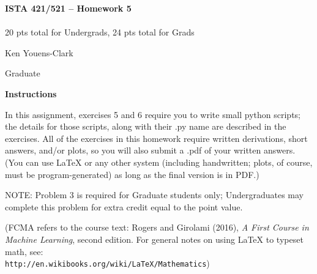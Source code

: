 \documentclass[10pt]{article}
\newcommand{\latex}{\LaTeX\xspace}
\begin{document}
\begin{center}
    {\Large {\bf ISTA 421/521 -- Homework 5}} \\
     \\
    20 pts total for Undergrads, 24 pts total for Grads\\
    
\end{center}

\begin{flushright}
Ken Youens-Clark

Graduate 
\end{flushright}

\vspace{1cm}
{\Large {\bf Instructions}}

In this assignment, exercises 5 and 6 require you to write small python scripts; the details for those scripts, along with their .py name are described in the exercises.  All of the exercises in this homework require written derivations, short answers, and/or plots, so you will also submit a .pdf of your written answers.  (You can use \latex or any other system (including handwritten; plots, of course, must be program-generated) as long as the final version is in PDF.)


NOTE: Problem 3 is required for Graduate students only; Undergraduates may complete this problem for extra credit equal to the point value.

(FCMA refers to the course text: Rogers and Girolami (2016), {\em A First Course in Machine Learning}, second edition.  For general notes on using \latex to typeset math, see: \\{\tt http://en.wikibooks.org/wiki/LaTeX/Mathematics})
\vspace{.5cm}



\end{document}
